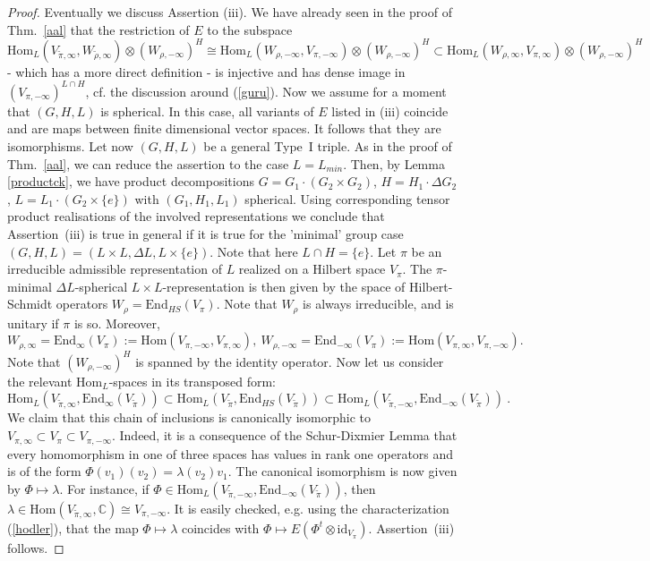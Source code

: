 \documentclass[10]{amsart}
\theoremstyle{remark}
\theoremstyle{definition}
\numberwithin{equation}{section}
\newcommand{\C}{\mathbb{C}}           %
\newcommand{\End}{\text{End}}
\newcommand{\Hom}{\mathrm{Hom}}
\newcommand{\id}{\mathrm{id}}
\begin{document}
{\begin{proof}
Eventually we discuss Assertion (iii). We have already seen in the proof of  Thm.~\ref{aal} that the restriction of $E$ to the subspace $\Hom_L(V_{\tilde \pi,\infty}, W_{\tilde\rho,\infty})\otimes  (W_{\rho,-\infty})^H\cong \Hom_L(W_{\rho,-\infty},V_{\pi,-\infty})\otimes (W_{\rho,-\infty})^H\subset \Hom_L(W_{\rho,\infty},V_{\pi,\infty})\otimes (W_{\rho,-\infty})^H$ - which has a more direct definition - is injective and has dense image in $(V_{\pi,-\infty})^{L\cap H}$, cf. the discussion around (\ref{guru}). Now we assume for a moment that
$(G,H,L)$ is spherical. In this case, all variants of $E$ listed in (iii) coincide and are maps between finite dimensional vector spaces. It follows that they are isomorphisms. Let now $(G,H,L)$
be a general Type~I triple. As in the proof of Thm.~\ref{aal}, we can reduce the assertion to the case $L=L_{min}$. Then, by Lemma \ref{productck}, we have product decompositions $G=G_1\cdot (G_2\times G_2)$, $H= H_1\cdot \Delta G_2$, $L=L_1\cdot (G_2\times \{e\})$ with $(G_1,H_1,L_1)$ spherical. Using corresponding tensor product realisations of the involved representations
we conclude that Assertion~(iii) is true in general if it is true for the 'minimal' group case $(G,H,L)=(L\times L,\Delta L, L\times\{e\})$. Note that here $L\cap H=\{e\}$.
Let $\pi$ be an irreducible admissible representation  of $L$ realized on a Hilbert space $V_\pi$. The $\pi$-minimal  $\Delta L$-spherical $L\times L$-representation is then
given by the space of Hilbert-Schmidt operators 
$W_\rho=\End_{HS}(V_\pi)$. Note that $W_\rho$ is always irreducible, and is unitary if $\pi$ is so. Moreover,
$$ W_{\rho,\infty}=\End_\infty(V_\pi):=\Hom(V_{\pi,-\infty},V_{\pi,\infty}),\ W_{\rho,-\infty}=\End_{-\infty}(V_\pi):=\Hom(V_{\pi,\infty},V_{\pi,-\infty}).$$
Note that $(W_{\rho,-\infty})^H$ is spanned by the identity operator. 
Now let us consider the relevant $\Hom_L$-spaces in its transposed form:
$$ \Hom_L(V_{\tilde\pi,\infty},\End_\infty(V_{\tilde\pi}))\subset \Hom_L(V_{\tilde\pi},\End_{HS}(V_{\tilde\pi}))\subset \Hom_L(V_{\tilde\pi,-\infty},\End_{-\infty}(V_{\tilde\pi}))\ .$$
We claim that this chain of inclusions is canonically isomorphic to 
$V_{\pi,\infty}\subset V_\pi\subset V_{\pi,-\infty}$. Indeed, it is a consequence of the Schur-Dixmier Lemma that every homomorphism in one of three spaces has values
in rank one operators and is of the form
$ \Phi(v_1)(v_2)=\lambda(v_2)v_1$. The canonical isomorphism is now given by $\Phi\mapsto \lambda$. For instance, if $\Phi\in \Hom_L(V_{\tilde\pi,-\infty},\End_{-\infty}(V_{\tilde\pi}))$, then $\lambda\in \Hom(V_{\tilde\pi,\infty},\C)\cong V_{\pi,-\infty}$. It is  easily checked, e.g. using the characterization (\ref{hodler}), that the map $\Phi\mapsto\lambda$ coincides
with $\Phi\mapsto E(\Phi^t\otimes\id_{V_\pi})$. Assertion~(iii) follows.
\end{proof}

}
\end{document}
